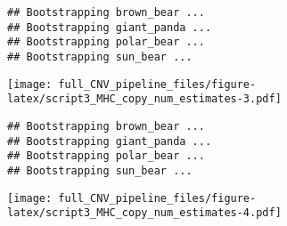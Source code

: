 \documentclass[]{article}
\begin{document}
\begin{verbatim}
## Bootstrapping brown_bear ...
## Bootstrapping giant_panda ...
## Bootstrapping polar_bear ...
## Bootstrapping sun_bear ...
\end{verbatim}

\texttt{[image: full\_CNV\_pipeline\_files/figure-latex/script3\_MHC\_copy\_num\_estimates-3.pdf]}

\begin{verbatim}
## Bootstrapping brown_bear ...
## Bootstrapping giant_panda ...
## Bootstrapping polar_bear ...
## Bootstrapping sun_bear ...
\end{verbatim}

\texttt{[image: full\_CNV\_pipeline\_files/figure-latex/script3\_MHC\_copy\_num\_estimates-4.pdf]}
\end{document}
